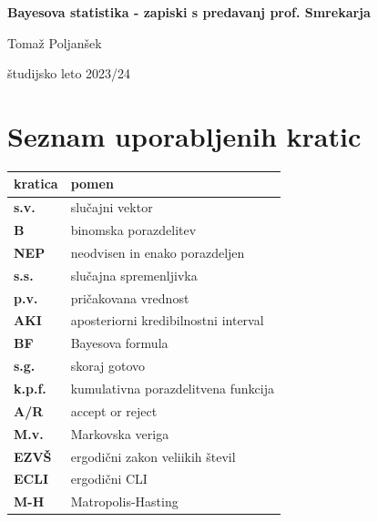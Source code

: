 \documentclass[a4paper, 12pt]{book}
\title{\ttitle}
\author{\tauthor}
\date{\tdate}
\newcommand{\ttitle}{Bayesova statistika - zapiski s predavanj prof. Smrekarja}
\newcommand{\tauthor}{Tomaž Poljanšek}
\newcommand{\tdate}{študijsko leto 2023/24}
\theoremstyle{definition}
\theoremstyle{remark}
\newcommand\mymaketitle{
  \begin{titlepage}
    \begin{center}
        \vspace*{4cm}
        \Huge
        \textbf{\ttitle}
                        
        \vspace{1.5cm}
        \huge
        \tauthor
            
        \vspace{3cm}
        \Large
        \tdate
    \end{center}
  \end{titlepage}
}
\begin{document}
\renewcommand{\thepage}{}
\newcommand{\sn}[1]{"`#1"'}

\mymaketitle

\clearpage
\frontmatter

\pagestyle{empty}
\def\thepage{}
\tableofcontents{}

\def\x{\hspace{3ex}}    %
\def\y{\hspace{2.45ex}}  %
\def\z{\hspace{1.9ex}}    %
\stackMath

\clearpage
{}

\section*{Seznam uporabljenih kratic}

\noindent\begin{tabular}{p{}|p{}}
  {\bf kratica} & {pomen} \\
  \hline
  {\bf s.v.} & {slučajni vektor} \\
  {\bf B} & {binomska porazdelitev} \\
  {\bf NEP} & {neodvisen in enako porazdeljen} \\
  {\bf s.s.} & {slučajna spremenljivka} \\
  {\bf p.v.} & {pričakovana vrednost} \\
  {\bf AKI} & {aposteriorni kredibilnostni interval} \\
  {\bf BF} & {Bayesova formula} \\
  {\bf s.g.} & {skoraj gotovo} \\
  {\bf k.p.f.} & {kumulativna porazdelitvena funkcija} \\
  {\bf A/R} & {accept or reject} \\
  {\bf M.v.} & {Markovska veriga} \\
  {\bf EZVŠ} & {ergodični zakon veliikih števil} \\
  {\bf ECLI} & {ergodični CLI} \\
  {\bf M-H} & {Matropolis-Hasting}
\end{tabular}

\end{document}
